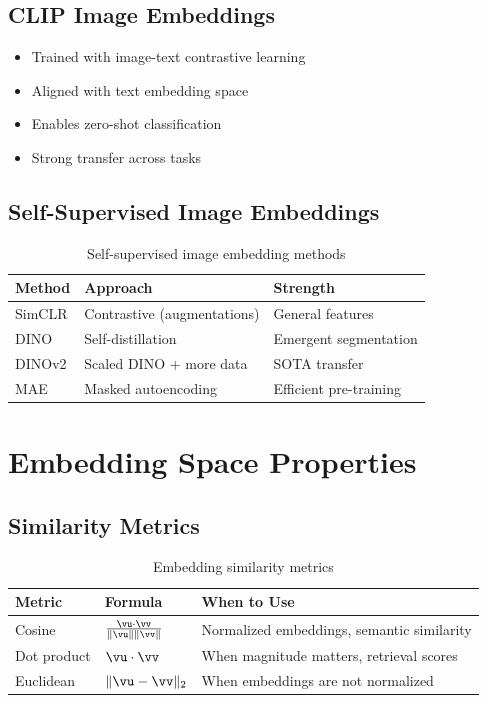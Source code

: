 \subsection{CLIP Image Embeddings}

\begin{itemize}
    \item Trained with image-text contrastive learning
    \item Aligned with text embedding space
    \item Enables zero-shot classification
    \item Strong transfer across tasks
\end{itemize}

\subsection{Self-Supervised Image Embeddings}

\begin{table}[H]
\centering
\caption{Self-supervised image embedding methods}
\begin{tabularx}{\textwidth}{lXX}
\toprule
\textbf{Method} & \textbf{Approach} & \textbf{Strength} \\
\midrule
SimCLR & Contrastive (augmentations) & General features \\
DINO & Self-distillation & Emergent segmentation \\
DINOv2 & Scaled DINO + more data & SOTA transfer \\
MAE & Masked autoencoding & Efficient pre-training \\
\bottomrule
\end{tabularx}
\end{table}

\section{Embedding Space Properties}
\label{sec:embedding_properties}

\subsection{Similarity Metrics}

\begin{table}[H]
\centering
\caption{Embedding similarity metrics}
\begin{tabularx}{\textwidth}{lXX}
\toprule
\textbf{Metric} & \textbf{Formula} & \textbf{When to Use} \\
\midrule
Cosine & $\frac{\vu \cdot \vv}{\|\vu\| \|\vv\|}$ & Normalized embeddings, semantic similarity \\
Dot product & $\vu \cdot \vv$ & When magnitude matters, retrieval scores \\
Euclidean & $\|\vu - \vv\|_2$ & When embeddings are not normalized \\
\bottomrule
\end{tabularx}
\end{table}

